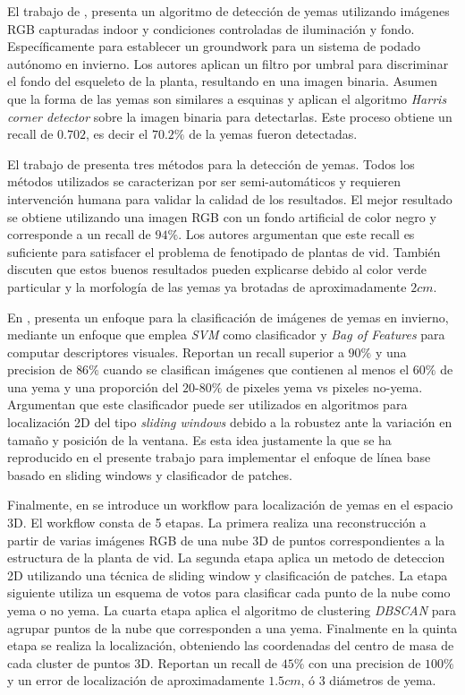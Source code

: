 \documentclass[a4paper,authoryear,review]{elsarticle}
\begin{document}
El trabajo de \citet{xu2014detection}, presenta un algoritmo de detección de yemas utilizando imágenes RGB capturadas indoor y condiciones controladas de iluminación y fondo. Específicamente para establecer un groundwork para un sistema de podado autónomo en invierno. Los autores aplican un filtro por umbral para discriminar el fondo del esqueleto de la planta, resultando en una imagen binaria. Asumen que la forma de las yemas son similares a esquinas y aplican el algoritmo \emph{Harris corner detector} sobre la imagen binaria para detectarlas. Este proceso obtiene un recall de $0.702$, es decir el $70.2\%$ de la yemas fueron detectadas. 

El trabajo de \citet{herzog2014initial} presenta tres métodos para la detección de yemas. Todos los métodos utilizados se caracterizan por ser semi-automáticos y requieren intervención humana para validar la calidad de los resultados. El mejor resultado se obtiene utilizando una imagen RGB con un fondo artificial de color negro y corresponde a un recall de $94\%$. Los autores argumentan que este recall es suficiente para satisfacer el problema de fenotipado de plantas de vid. También discuten que estos buenos resultados pueden explicarse debido al color verde particular y la morfología de las yemas ya brotadas de aproximadamente $2cm$. 

En \citet{perez2017image}, presenta un enfoque para la clasificación de imágenes de yemas en invierno, mediante un enfoque que emplea \emph{SVM} como clasificador y \emph{Bag of Features} para computar descriptores visuales. Reportan un recall superior a $90\%$ y una precision de $86\%$ cuando se clasifican imágenes que contienen al menos el $60\%$ de una yema y una proporción del $20$-$80\%$ de pixeles yema vs pixeles no-yema. Argumentan que este clasificador puede ser utilizados en algoritmos para localización 2D del tipo \emph{sliding windows} debido a la robustez ante la variación en tamaño y posición de la ventana. Es esta idea justamente la que se ha reproducido en el presente trabajo para implementar el enfoque de línea base basado en sliding windows y clasificador de patches.

Finalmente, en \citet{diaz2018grapevine} se introduce un workflow para localización de yemas en el espacio 3D. El workflow consta de 5 etapas. La primera realiza una reconstrucción a partir de varias imágenes RGB de una nube 3D de puntos correspondientes a la estructura de la planta de vid. La segunda etapa aplica un metodo de deteccion 2D utilizando una técnica de sliding window y clasificación de patches. La etapa siguiente utiliza un esquema de votos para clasificar cada punto de la nube como yema o no yema. La cuarta etapa aplica el algoritmo de clustering \emph{DBSCAN} para agrupar puntos de la nube que corresponden a una yema. Finalmente en la quinta etapa se realiza la localización, obteniendo las coordenadas del centro de masa de cada cluster de puntos 3D. Reportan un recall de $45\%$ con una precision de $100\%$ y un error de localización de aproximadamente $1.5cm$, ó 3 diámetros de yema. 
\end{document}
